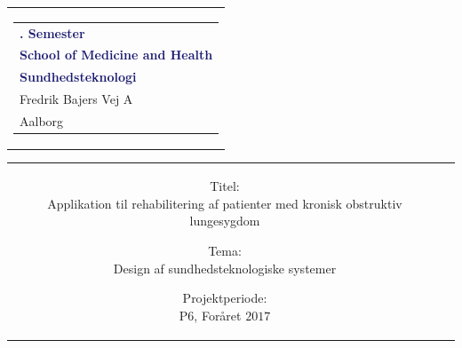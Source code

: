 % 
\thispagestyle{empty}
\begin{nopagebreak}
	{\samepage 
		
		\begin{tabular}{r}
			\parbox{\textwidth}{  
				\hfill \hspace{2cm} \parbox{8cm}{\begin{tabular}{l} %
						{\small \textbf{\textcolor{MidnightBlue}{{$6$. Semester}}}}\\
						{\small \textbf{\textcolor{MidnightBlue}{School of Medicine and Health}}}\\
						{\small \textbf{\textcolor{MidnightBlue}{Sundhedsteknologi}}}\\
						{\small \textcolor{NavyBlue}{Fredrik Bajers Vej $7$A}} \\
						{\small \textcolor{NavyBlue}{$9220$ Aalborg}} \\
			\end{tabular}}}
		\end{tabular}
		
		\begin{tabular}{cc}
			\parbox{7cm}{
				\begin{description}

\item {Titel:} \\
Applikation til rehabilitering af  patienter med kronisk obstruktiv lungesygdom\\

\item {Tema:} \\
Design af sundhedsteknologiske systemer \\

\end{description}

\parbox{8cm}{

\begin{description}
\item {Projektperiode:}\\
   P$6$, Foråret $2017$\\
   

\end{description}}}
\end{tabular}}
\end{nopagebreak}
